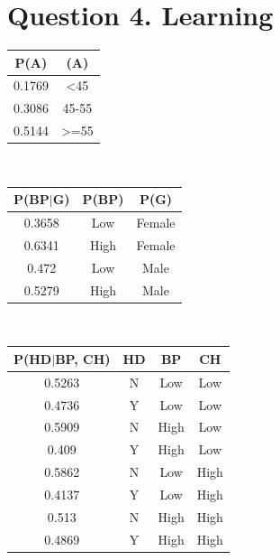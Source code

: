 \documentclass[11pt]{article} %
\begin{document}
\section*{Question 4. Learning}
\begin{tabular}{|c|c|}
\hline
P(A)   & (A)   \\ \hline
0.1769 & \textless45   \\ \hline
0.3086 & 45-55 \\ \hline
0.5144 & \textgreater=55  \\ \hline
\end{tabular}
\vspace*{1em}\\
\begin{tabular}{|c|c|c|}
\hline
P(BP$|$G) & P(BP) & P(G)   \\ \hline
0.3658  & Low   & Female \\ \hline
0.6341  & High  & Female \\ \hline
0.472   & Low   & Male   \\ \hline
0.5279  & High  & Male   \\ \hline
\end{tabular}
\vspace*{1em}\\
\begin{tabular}{|c|c|c|c|}
\hline
P(HD$|$BP, CH) & HD & BP   & CH   \\ \hline
0.5263         & N  & Low  & Low  \\ \hline
0.4736         & Y  & Low  & Low  \\ \hline
0.5909         & N  & High & Low  \\ \hline
0.409          & Y  & High & Low  \\ \hline
0.5862         & N  & Low  & High \\ \hline
0.4137         & Y  & Low  & High \\ \hline
0.513          & N  & High & High \\ \hline
0.4869         & Y  & High & High \\ \hline
\end{tabular}
\vspace*{1em} \\ \\
\end{document}
